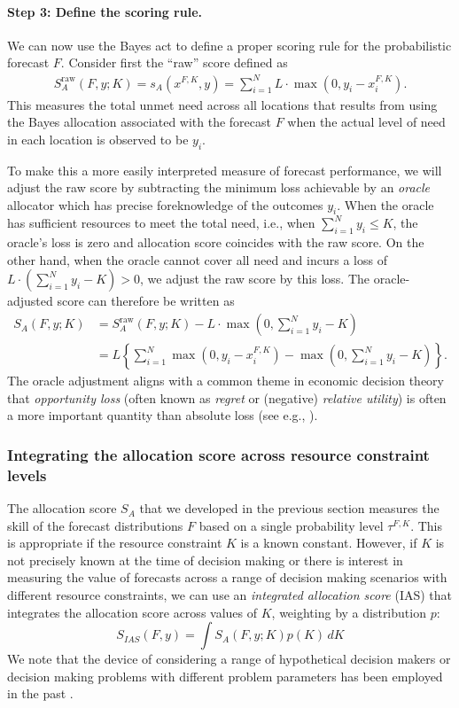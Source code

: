 \documentclass{article}\usepackage[]{graphicx}\usepackage[]{xcolor}
\begin{document}
\paragraph{Step 3: Define the scoring rule.} We can now use the Bayes act to define a proper scoring rule for the probabilistic forecast $F$.
Consider first the ``raw'' score defined as
\begin{align}
S_A^{\text{raw}}(F, y; K) = s_A(x^{F,K}, y) = \sum_{i=1}^N L \cdot \max(0, y_i - x_i^{F,K}).
\end{align}
This measures the total unmet need across all locations that results from using the Bayes allocation associated with the forecast $F$ when the actual level of need in each location is observed to be $y_i$.

To make this a more easily interpreted measure of forecast performance, we will adjust the raw score by subtracting the minimum loss
achievable by an \emph{oracle} allocator which has precise foreknowledge of the outcomes $y_i$.
When the oracle has sufficient resources to meet the total need, i.e., when $\sum_{i=1}^{N}y_i \leq K$, the oracle's loss is zero
and allocation score coincides with the raw score.
On the other hand, when the oracle cannot cover all need and incurs a loss of $L \cdot \left(\sum_{i=1}^{N}y_i - K \right) > 0$, we adjust
the raw score by this loss.
The oracle-adjusted score can therefore be written as
\begin{align}
S_A(F, y; K)  &= S_A^{\text{raw}}(F, y; K) - L \cdot \max\left(0,\sum_{i=1}^{N}y_i - K\right) \\
&= L\left\{\sum_{i=1}^N \max(0, y_i - x_i^{F,K}) -  \max\left(0,\sum_{i=1}^{N}y_i - K\right)\right\}.
\end{align}
The oracle adjustment aligns with a common theme in economic decision theory that \emph{opportunity loss} (often known as \emph{regret} or (negative) \emph{relative utility}) is often a more important quantity than absolute loss (see e.g., \cite{DIECIDUE201788}).

\subsubsection{Integrating the allocation score across resource constraint levels}{}
\label{sec:methods.detailed.integrated_allocation}

The allocation score $S_A$ that we developed in the previous section measures the skill of the forecast distributions $F$ based on a single probability level $\tau^{F,K}$. This is appropriate if the resource constraint $K$ is a known constant. However, if $K$ is not precisely known at the time of decision making or there is interest in measuring the value of forecasts across a range of decision making scenarios with different resource constraints, we can use an \emph{integrated allocation score} (IAS) that integrates the allocation score across values of $K$, weighting by a distribution $p$:
$$S_{IAS}(F, y) = \int S_A(F,y; K) p(K) \, dK$$
We note that the device of considering a range of hypothetical decision makers or decision making problems with different problem parameters has been employed in the past \cite[e.g.,][]{murphy1993whatisagoodforecast}.
\end{document}
